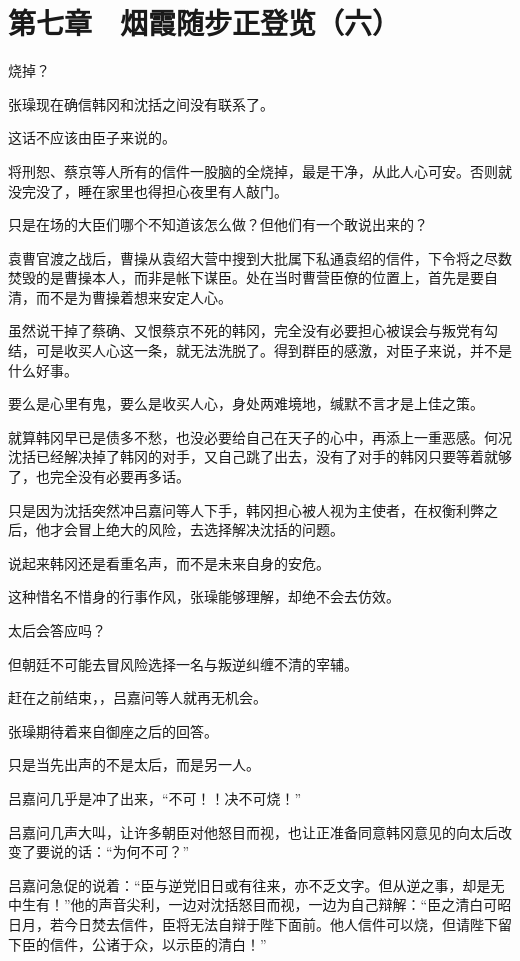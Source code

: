 \section{第七章　烟霞随步正登览（六）}

烧掉？

张璪现在确信韩冈和沈括之间没有联系了。

这话不应该由臣子来说的。

将刑恕、蔡京等人所有的信件一股脑的全烧掉，最是干净，从此人心可安。否则就没完没了，睡在家里也得担心夜里有人敲门。

只是在场的大臣们哪个不知道该怎么做？但他们有一个敢说出来的？

袁曹官渡之战后，曹操从袁绍大营中搜到大批属下私通袁绍的信件，下令将之尽数焚毁的是曹操本人，而非是帐下谋臣。处在当时曹营臣僚的位置上，首先是要自清，而不是为曹操着想来安定人心。

虽然说干掉了蔡确、又恨蔡京不死的韩冈，完全没有必要担心被误会与叛党有勾结，可是收买人心这一条，就无法洗脱了。得到群臣的感激，对臣子来说，并不是什么好事。

要么是心里有鬼，要么是收买人心，身处两难境地，缄默不言才是上佳之策。

就算韩冈早已是债多不愁，也没必要给自己在天子的心中，再添上一重恶感。何况沈括已经解决掉了韩冈的对手，又自己跳了出去，没有了对手的韩冈只要等着就够了，也完全没有必要再多话。

只是因为沈括突然冲吕嘉问等人下手，韩冈担心被人视为主使者，在权衡利弊之后，他才会冒上绝大的风险，去选择解决沈括的问题。

说起来韩冈还是看重名声，而不是未来自身的安危。

这种惜名不惜身的行事作风，张璪能够理解，却绝不会去仿效。

太后会答应吗？

但朝廷不可能去冒风险选择一名与叛逆纠缠不清的宰辅。

赶在之前结束，，吕嘉问等人就再无机会。

张璪期待着来自御座之后的回答。

只是当先出声的不是太后，而是另一人。

吕嘉问几乎是冲了出来，“不可！！决不可烧！”

吕嘉问几声大叫，让许多朝臣对他怒目而视，也让正准备同意韩冈意见的向太后改变了要说的话：“为何不可？”

吕嘉问急促的说着：“臣与逆党旧日或有往来，亦不乏文字。但从逆之事，却是无中生有！”他的声音尖利，一边对沈括怒目而视，一边为自己辩解：“臣之清白可昭日月，若今日焚去信件，臣将无法自辩于陛下面前。他人信件可以烧，但请陛下留下臣的信件，公诸于众，以示臣的清白！”

